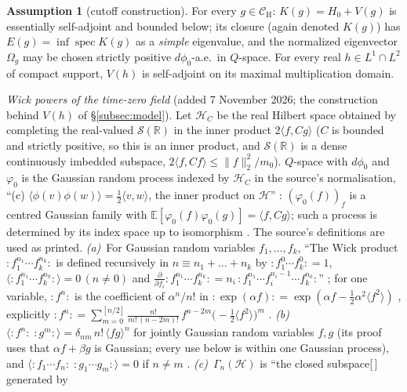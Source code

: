 \documentclass[11pt,a4paper]{article}
\theoremstyle{plain}
\theoremstyle{definition}
\newtheorem{assumption}{Assumption}
\theoremstyle{plain}
\theoremstyle{definition}
\newcommand{\R}{\mathbb{R}}
\newcommand{\E}{\mathbb{E}}
\newcommand{\CH}{\mathcal{C}_{\mathrm H}}
\newcommand{\HH}{\mathcal{H}}
\newcommand{\Om}{\Omega}
\newcommand{\ip}[2]{\langle #1,#2\rangle}
\DeclareMathOperator{\spec}{spec}
\begin{document}
\begin{assumption}[cutoff construction]\label{A:cutoff}
For every $g\in\CH$: $K(g)=H_0+V(g)$ is essentially self-adjoint and bounded below; its closure
(again denoted $K(g)$) has $E(g)=\inf\spec K(g)$ as a \emph{simple} eigenvalue, and the
normalized eigenvector $\Om_g$ may be chosen strictly positive $d\phi_0$-a.e.\ in $Q$-space.
For every real $h\in L^1\cap L^2$ of compact support, $V(h)$ is self-adjoint on its maximal
multiplication domain.

\emph{Wick powers of the time-zero field} (added 7 November 2026; the construction behind
$V(h)$ of \S\ref{subsec:model}).  Let $\HH_C$ be the real Hilbert space obtained by
completing the real-valued $\mathcal S(\R)$ in the inner product $2\ip f{Cg}$ ($C$ is bounded and
strictly positive, so this is an inner product, and $\mathcal S(\R)$ is a dense continuously
imbedded subspace, $2\ip f{Cf}\le\|f\|_2^2/m_0$).  $Q$-space with $d\phi_0$ and $\varphi_0$ is
the Gaussian random process indexed by $\HH_C$ in the source's normalisation, ``(c)
$\langle\phi(v)\phi(w)\rangle=\frac12\langle v,w\rangle$, the inner product on $\mathcal H$''
\cite[Definition, p.~15]{SimonBook}: $(\varphi_0(f))_f$ is a centred Gaussian family with
$\E[\varphi_0(f)\varphi_0(g)]=\ip f{Cg}$; such a process is determined by its index space up to
isomorphism \cite[Thm.~I.6, p.~15]{SimonBook}.  The
source's definitions are used as printed.
\emph{(a)}~For Gaussian random variables $f_1,\dots,f_k$, ``The Wick product
${:}f_1^{n_1}\cdots f_k^{n_k}{:}$ is defined recursively in $n\equiv n_1+\dots+n_k$ by
${:}f_1^0\cdots f_k^0{:}=1$, $\langle{:}f_1^{n_1}\cdots f_k^{n_k}{:}\rangle=0\,(n\ne0)$ and
$\frac{\partial}{\partial f_i}{:}f_1^{n_1}\cdots f_k^{n_k}{:}=n_i\,{:}f_1^{n_1}\cdots
f_i^{n_i-1}\cdots f_k^{n_k}{:}$'' \cite[p.~12]{SimonBook}; for one variable,
${:}f^n{:}$ is the coefficient of $\alpha^n/n!$ in ${:}\exp(\alpha f){:}=\exp(\alpha
f-\frac12\alpha^2\langle f^2\rangle)$ \cite[(I.15), (I.18a), p.~10]{SimonBook}, explicitly
${:}f^n{:}=\sum_{m=0}^{[n/2]}\frac{n!}{m!\,(n-2m)!}\,f^{n-2m}\bigl(-\tfrac12\langle
f^2\rangle\bigr)^m$ \cite[(I.18b), p.~10]{SimonBook}.
\emph{(b)}~$\langle{:}f^n{:}\;{:}g^m{:}\rangle=\delta_{nm}\,n!\,\langle fg\rangle^n$ for
jointly Gaussian random variables $f,g$ \cite[Thm.~I.3, (I.21), p.~11]{SimonBook} (its proof
uses that $\alpha f+\beta g$ is Gaussian; every use below is within one Gaussian process), and
$\langle{:}f_1\cdots f_n{:}\;{:}g_1\cdots g_m{:}\rangle=0$ if $n\ne m$
\cite[Cor.~I.4, (I.23a), p.~12]{SimonBook}.
\emph{(c)}~$\Gamma_n(\HH)$ is ``the closed subspace[\,] generated by

\end{assumption}
\end{document}
